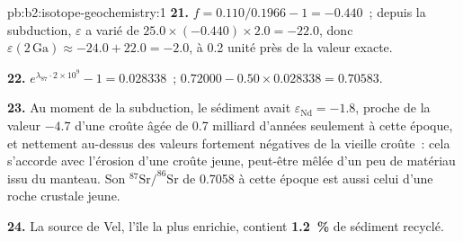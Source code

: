 \begin{solution}{pb:b2:isotope-geochemistry:1}
\textbf{21.} $f = 0.110/0.1966 - 1 = -0.440$~; depuis la subduction, $\varepsilon$ a varié de
$25.0\times(-0.440)\times2.0 = -22.0$, donc $\varepsilon(2\,\mathrm{Ga}) \approx -24.0 + 22.0
= -2.0$, à 0.2 unité près de la valeur exacte.

\textbf{22.} $e^{\lambda_{87}\cdot2\times10^9} - 1 = 0.028338$~;
$0.72000 - 0.50\times0.028338 = 0.70583$.

\textbf{23.} Au moment de la subduction, le sédiment avait $\varepsilon_{\mathrm{Nd}} = -1.8$, proche de
la valeur $-4.7$ d'une croûte âgée de 0.7 milliard d'années seulement à cette époque, et nettement au-dessus des
valeurs fortement négatives de la vieille croûte~: cela s'accorde avec l'érosion d'une croûte jeune, peut-être
mêlée d'un peu de matériau issu du manteau. Son $^{87}\mathrm{Sr}/^{86}\mathrm{Sr}$ de
0.7058 à cette époque est aussi celui d'une roche crustale jeune.

\textbf{24.} La source de Vel, l'île la plus enrichie, contient
\textbf{\qty[text-series-to-math=true]{1.2}{\percent}} de sédiment recyclé.
\end{solution}
